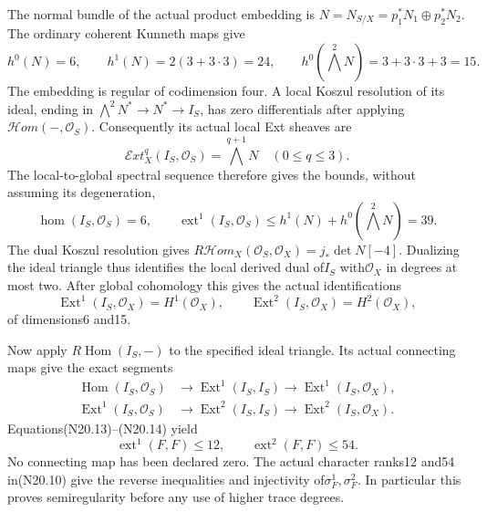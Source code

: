 The normal bundle of the actual product embedding is
$N=N_{S/X}=p_1^*N_1\oplus p_2^*N_2$.
The ordinary coherent Kunneth maps give
\[
 h^0(N)=6,\qquad h^1(N)=2(3+3\cdot3)=24,\qquad
 h^0(\bigwedge^2N)=3+3\cdot3+3=15.                             \tag{N20.11}
\]
The embedding is regular of codimension four. A local Koszul
resolution of its ideal, ending in
$\bigwedge^2N^*\to N^*\to I_S$, has zero differentials after
applying $\mathcal Hom(-,\mathcal O_S)$. Consequently its actual
local Ext sheaves are
\[
 \mathcal Ext_X^q(I_S,\mathcal O_S)=\bigwedge^{q+1}N
                      \quad(0\le q\le3).                      \tag{N20.12}
\]
The local-to-global spectral sequence therefore gives the
bounds, without assuming its degeneration,
\[
 \operatorname{hom}(I_S,\mathcal O_S)=6,\qquad
 \operatorname{ext}^1(I_S,\mathcal O_S)
              \le h^1(N)+h^0(\bigwedge^2N)=39.                 \tag{N20.13}
\]
The dual Koszul resolution gives
$R\mathcal Hom_X(\mathcal O_S,\mathcal O_X)
 =j_*\det N[-4]$.
Dualizing the ideal triangle thus identifies the local derived
dual of$I_S$ with$\mathcal O_X$ in degrees at most two.
After global cohomology this gives the actual identifications
\[
 \operatorname{Ext}^1(I_S,\mathcal O_X)=H^1(\mathcal O_X),
 \qquad
 \operatorname{Ext}^2(I_S,\mathcal O_X)=H^2(\mathcal O_X),        \tag{N20.14}
\]
of dimensions6 and15.

Now apply $R\operatorname{Hom}(I_S,-)$ to the specified ideal
triangle. Its actual connecting maps give the exact segments
\[
 \begin{split}
 \operatorname{Hom}(I_S,\mathcal O_S)&\longrightarrow
 \operatorname{Ext}^1(I_S,I_S)\longrightarrow
 \operatorname{Ext}^1(I_S,\mathcal O_X),\\
 \operatorname{Ext}^1(I_S,\mathcal O_S)&\longrightarrow
 \operatorname{Ext}^2(I_S,I_S)\longrightarrow
 \operatorname{Ext}^2(I_S,\mathcal O_X).
 \end{split}
\]
Equations(N20.13)--(N20.14) yield
\[
              \operatorname{ext}^1(F,F)\le12,\qquad
              \operatorname{ext}^2(F,F)\le54.                  \tag{N20.15}
\]
No connecting map has been declared zero. The actual character
ranks12 and54 in(N20.10) give the reverse inequalities and
injectivity of$\sigma_F^1,\sigma_F^2$. In particular this proves
semiregularity before any use of higher trace degrees.

